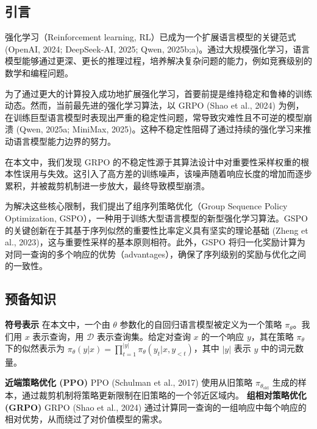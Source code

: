 



\subsection{引言}
强化学习（Reinforcement learning, RL）已成为一个扩展语言模型的关键范式 (OpenAI, 2024; DeepSeek-AI, 2025; Qwen, 2025b;a)。通过大规模强化学习，语言模型能够通过更深、更长的推理过程，培养解决复杂问题的能力，例如竞赛级别的数学和编程问题。

为了通过更大的计算投入成功地扩展强化学习，首要前提是维持稳定和鲁棒的训练动态。然而，当前最先进的强化学习算法，以 GRPO (Shao et al., 2024) 为例，在训练巨型语言模型时表现出严重的稳定性问题，常导致灾难性且不可逆的模型崩溃 (Qwen, 2025a; MiniMax, 2025)。这种不稳定性阻碍了通过持续的强化学习来推动语言模型能力边界的努力。

在本文中，我们发现 GRPO 的不稳定性源于其算法设计中对重要性采样权重的根本性误用与失效。这引入了高方差的训练噪声，该噪声随着响应长度的增加而逐步累积，并被裁剪机制进一步放大，最终导致模型崩溃。

为解决这些核心限制，我们提出了组序列策略优化（Group Sequence Policy Optimization, GSPO），一种用于训练大型语言模型的新型强化学习算法。GSPO 的关键创新在于其基于序列似然的重要性比率定义具有坚实的理论基础 (Zheng et al., 2023)，这与重要性采样的基本原则相符。此外，GSPO 将归一化奖励计算为对同一查询的多个响应的优势（advantages），确保了序列级别的奖励与优化之间的一致性。

\subsection{预备知识}
\textbf{符号表示} \quad 在本文中，一个由 $\theta$ 参数化的自回归语言模型被定义为一个策略 $\pi_\theta$。我们用 $x$ 表示查询，用 $\mathcal{D}$ 表示查询集。给定对查询 $x$ 的一个响应 $y$，其在策略 $\pi_\theta$ 下的似然表示为 $\pi_\theta(y|x) = \prod_{t=1}^{|y|} \pi_\theta(y_t|x, y_{<t})$，其中 $|y|$ 表示 $y$ 中的词元数量。

\textbf{近端策略优化 (PPO)} \quad PPO (Schulman et al., 2017) 使用从旧策略 $\pi_{\theta_{\text{old}}}$ 生成的样本，通过裁剪机制将策略更新限制在旧策略的一个邻近区域内。
\textbf{组相对策略优化 (GRPO)} \quad GRPO (Shao et al., 2024) 通过计算同一查询的一组响应中每个响应的相对优势，从而绕过了对价值模型的需求。

